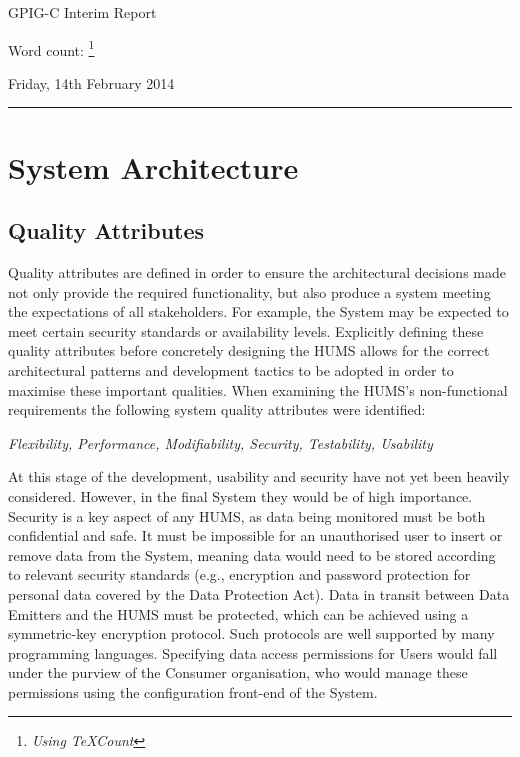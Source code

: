 \documentclass[10pt,a4paper]{article}
\begin{document}
\begin{center}
{\Large GPIG-C Interim Report}

Word count: \unskip
\footnote{\textit{Using TeXCount}}

Friday, 14th February 2014
\end{center}

\vspace{0.3cm}
\rule{\textwidth}{0.4pt}




\section{System Architecture}
\label{sec:architecture}

\subsection{Quality Attributes}
\label{sec:architecture-quality}

Quality attributes are defined in order to ensure the architectural decisions 
made not only provide the required functionality, but also produce a system
meeting the expectations of all stakeholders. For example, the System may be expected to meet certain security standards or availability levels. Explicitly defining these quality attributes before concretely designing the HUMS allows for the correct architectural patterns and development tactics to be adopted in order to maximise these important qualities.
When examining the HUMS's non-functional requirements the 
following system quality attributes were identified:
	\begin{center}
	\textit{Flexibility, Performance, Modifiability, Security, 
Testability, Usability}
	\end{center}
At this stage of the development, usability and security 
have not yet been heavily considered. However, in the final System they 
would be of high importance. Security is a key aspect of any HUMS, 
as data being monitored must be both confidential and safe. It must be impossible for an unauthorised user to insert or remove data from the System, meaning data would need to be stored according to relevant security standards  (e.g., encryption and password protection for personal data covered by the Data Protection Act). Data in transit between Data Emitters and the HUMS must be protected, which can be achieved using a symmetric-key encryption protocol. Such protocols are well supported by many programming languages. Specifying data access permissions for Users would fall under the purview of the Consumer organisation, who would manage these permissions using the configuration front-end of the System.
\end{document}
